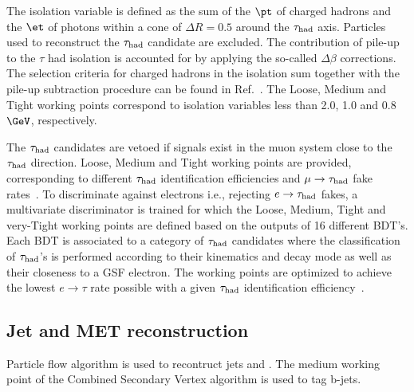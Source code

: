 The isolation variable is defined as the sum of the $\pt$ of charged hadrons and the $\et$ of photons within a cone of $\Delta R = 0.5$ around the $\tau_{\rm had}$ axis. Particles used to reconstruct the $\tau_{\rm had}$ candidate are excluded. The contribution of pile-up to the $\tau$ had isolation is accounted for by applying the so-called $\Delta\beta$ corrections. The selection criteria for charged hadrons in the isolation sum together with the pile-up subtraction procedure can be found in Ref.~\cite{CMS_AN_2013-171}. The Loose, Medium and Tight working points correspond to isolation variables less than 2.0, 1.0 and 0.8\,$\GeV$, respectively.

The $\tau_{\rm had}$ candidates are vetoed if signals exist in the muon system close to the $\tau_{\rm had}$ direction. Loose, Medium and Tight working points are provided, corresponding to different $\tau_{\rm had}$ identification efficiencies and $\mu\to\tau_{\rm had}$ fake rates~\cite{CMS_AN_2013-171}. To discriminate against electrons i.e., rejecting $e\to\tau_{\rm had}$ fakes, a multivariate discriminator is trained for which the Loose, Medium, Tight and very-Tight working points are defined based on the outputs of 16 different BDT's. Each BDT is associated to a category of $\tau_{\rm had}$ candidates where the classification of $\tau_{\rm had}$'s is performed according to their kinematics and decay mode as well as their closeness to a GSF electron. The working points are optimized to achieve the lowest $e\to\tau$ rate possible with a given $\tau_{\rm had}$ identification efficiency~\cite{CMS_AN_2012-417}.

\subsection{Jet and MET reconstruction}
\label{sec:jetmet}
Particle flow algorithm is used to recontruct jets and \ETmiss. The medium working point of the Combined Secondary Vertex algorithm is used to tag b-jets.


